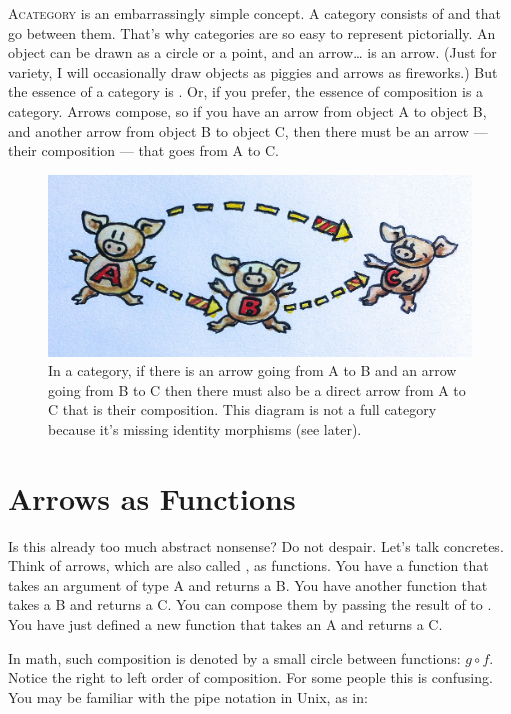 \lettrine[lhang=0.17]{A}{category} is an embarrassingly simple concept.
A category consists of  and  that go between them. That's
why categories are so easy to represent pictorially. An object can be
drawn as a circle or a point, and an arrow\ldots{} is an arrow. (Just
for variety, I will occasionally draw objects as piggies and arrows as
fireworks.) But the essence of a category is . Or, if you
prefer, the essence of composition is a category. Arrows compose, so
if you have an arrow from object A to object B, and another arrow from
object B to object C, then there must be an arrow --- their composition
--- that goes from A to C.

\begin{figure}
\centering
\includegraphics[width=\textwidth]{images/img_1330.jpg}
\captionsetup{labelformat=empty,font=scriptsize}
\caption{In a category, if there is an arrow going from A to B and an arrow going from B to C then there must also be a direct arrow from A to C that is their composition. This diagram is not a full category because it’s missing identity morphisms (see later).}
\end{figure}

\section{Arrows as Functions}\label{arrows-as-functions}

Is this already too much abstract nonsense? Do not despair. Let's talk
concretes. Think of arrows, which are also called , as
functions. You have a function  that takes an argument of type A and
returns a B. You have another function  that takes a B and returns a C.
You can compose them by passing the result of  to . You have just
defined a new function that takes an A and returns a C.

In math, such composition is denoted by a small circle between
functions: \ensuremath{g \circ f}. Notice the right to left order of composition. For some
people this is confusing. You may be familiar with the pipe notation in
Unix, as in:

